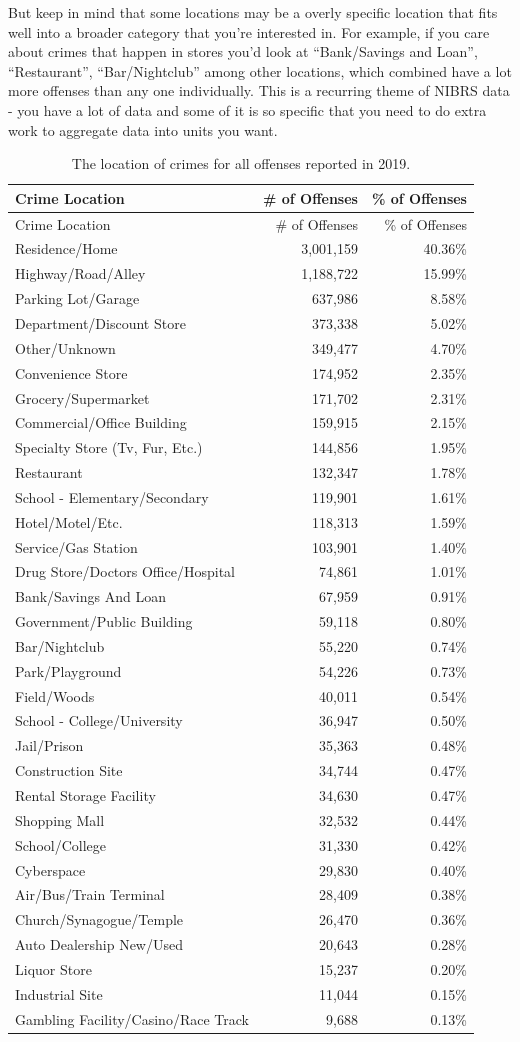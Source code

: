 \documentclass[
  12pt,
  openany]{book}
\begin{document}
But keep in mind that some locations may be a overly specific location that fits well into a broader category that you're interested in. For example, if you care about crimes that happen in stores you'd look at ``Bank/Savings and Loan'', ``Restaurant'', ``Bar/Nightclub'' among other locations, which combined have a lot more offenses than any one individually. This is a recurring theme of NIBRS data - you have a lot of data and some of it is so specific that you need to do extra work to aggregate data into units you want.

\begin{longtable}[]{@{}lrr@{}}
\caption{\label{tab:offenseLocation}The location of crimes for all offenses reported in 2019.}\tabularnewline
\toprule
Crime Location & \# of Offenses & \% of Offenses\tabularnewline
\midrule
\endfirsthead
\toprule
Crime Location & \# of Offenses & \% of Offenses\tabularnewline
\midrule
\endhead
Residence/Home & 3,001,159 & 40.36\%\tabularnewline
Highway/Road/Alley & 1,188,722 & 15.99\%\tabularnewline
Parking Lot/Garage & 637,986 & 8.58\%\tabularnewline
Department/Discount Store & 373,338 & 5.02\%\tabularnewline
Other/Unknown & 349,477 & 4.70\%\tabularnewline
Convenience Store & 174,952 & 2.35\%\tabularnewline
Grocery/Supermarket & 171,702 & 2.31\%\tabularnewline
Commercial/Office Building & 159,915 & 2.15\%\tabularnewline
Specialty Store (Tv, Fur, Etc.) & 144,856 & 1.95\%\tabularnewline
Restaurant & 132,347 & 1.78\%\tabularnewline
School - Elementary/Secondary & 119,901 & 1.61\%\tabularnewline
Hotel/Motel/Etc. & 118,313 & 1.59\%\tabularnewline
Service/Gas Station & 103,901 & 1.40\%\tabularnewline
Drug Store/Doctors Office/Hospital & 74,861 & 1.01\%\tabularnewline
Bank/Savings And Loan & 67,959 & 0.91\%\tabularnewline
Government/Public Building & 59,118 & 0.80\%\tabularnewline
Bar/Nightclub & 55,220 & 0.74\%\tabularnewline
Park/Playground & 54,226 & 0.73\%\tabularnewline
Field/Woods & 40,011 & 0.54\%\tabularnewline
School - College/University & 36,947 & 0.50\%\tabularnewline
Jail/Prison & 35,363 & 0.48\%\tabularnewline
Construction Site & 34,744 & 0.47\%\tabularnewline
Rental Storage Facility & 34,630 & 0.47\%\tabularnewline
Shopping Mall & 32,532 & 0.44\%\tabularnewline
School/College & 31,330 & 0.42\%\tabularnewline
Cyberspace & 29,830 & 0.40\%\tabularnewline
Air/Bus/Train Terminal & 28,409 & 0.38\%\tabularnewline
Church/Synagogue/Temple & 26,470 & 0.36\%\tabularnewline
Auto Dealership New/Used & 20,643 & 0.28\%\tabularnewline
Liquor Store & 15,237 & 0.20\%\tabularnewline
Industrial Site & 11,044 & 0.15\%\tabularnewline
Gambling Facility/Casino/Race Track & 9,688 & 0.13\%\tabularnewline

\end{longtable}
\end{document}
